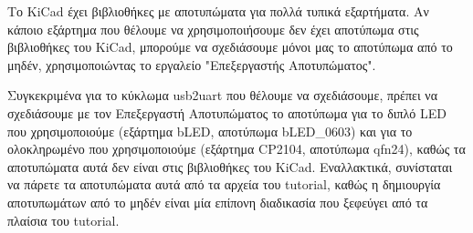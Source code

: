 \documentclass[a4paper]{article}
\begin{document}
Το \textenglish{KiCad} έχει βιβλιοθήκες με αποτυπώματα για πολλά τυπικά εξαρτήματα. Αν κάποιο εξάρτημα που θέλουμε να χρησιμοποιήσουμε δεν έχει αποτύπωμα στις βιβλιοθήκες του \textenglish{KiCad}, μπορούμε να σχεδιάσουμε μόνοι μας το αποτύπωμα από το μηδέν, χρησιμοποιώντας το εργαλείο "Επεξεργαστής Αποτυπώματος".

Συγκεκριμένα για το κύκλωμα usb2uart που θέλουμε να σχεδιάσουμε, πρέπει να σχεδιάσουμε με τον Επεξεργαστή Αποτυπώματος το αποτύπωμα για το διπλό \textenglish{LED} που χρησιμοποιούμε (εξάρτημα b\textenglish{LED}, αποτύπωμα b\textenglish{LED}\_0603) και για το ολοκληρωμένο που χρησιμοποιούμε (εξάρτημα \textenglish{CP2104}, αποτύπωμα qfn24), καθώς τα αποτυπώματα αυτά δεν είναι στις βιβλιοθήκες του \textenglish{KiCad}. Εναλλακτικά, συνίσταται να πάρετε τα αποτυπώματα αυτά από τα αρχεία του tutorial, καθώς η δημιουργία αποτυπωμάτων από το μηδέν είναι μία επίπονη διαδικασία που ξεφεύγει από τα πλαίσια του tutorial.

\end{document}
